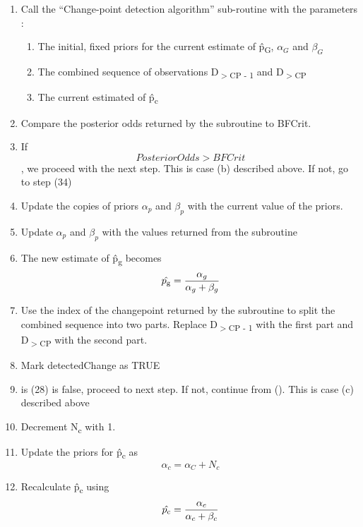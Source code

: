 \documentclass{article}
\begin{document}
\begin{enumerate}
\item Call the ``Change-point detection algorithm'' sub-routine with the parameters :
	\begin{enumerate}
		\item The initial, fixed priors for the current estimate of \^{p\textsubscript{G}}, $\alpha_G$ and $\beta_G$
		\item The combined sequence of observations  D\textsubscript{$>$CP - 1} and D\textsubscript{$>$CP}
		\item The current estimated  of \^{p\textsubscript{c}}
	\end{enumerate}

\item Compare the posterior odds returned by the subroutine to BFCrit. 

\item If \[ Posterior Odds > BFCrit \], we proceed with the next step. This is case (b) described above. If not, go to step (34)

\item Update the copies of priors $\alpha_p$ and $\beta_p$ with the current value of the priors.

\item Update $\alpha_p$ and $\beta_p$ with the values returned from the subroutine

\item The new estimate of \^{p\textsubscript{g}} becomes \[ \hat{p\textsubscript{g}} = \frac{\alpha_g}{\alpha_g + \beta_g} \]

\item Use the index of the changepoint returned by the subroutine to split the combined sequence into two parts. Replace D\textsubscript{$>$CP - 1} with the first part and D\textsubscript{$>$CP} with the second part.

\item Mark detectedChange as TRUE

\item is (28) is false, proceed to next step. If not, continue from (). This is case (c) described above

\item Decrement N\textsubscript{c} with 1.

\item  Update the priors for \^{p\textsubscript{c}} as
\[ \alpha_c = \alpha_C + N_c\]

\item Recalculate \^{p\textsubscript{c}} using
\[ \hat{p\textsubscript{c}} = \frac{\alpha_c}{\alpha_c + \beta_c} \]


\end{enumerate}
\end{document}
